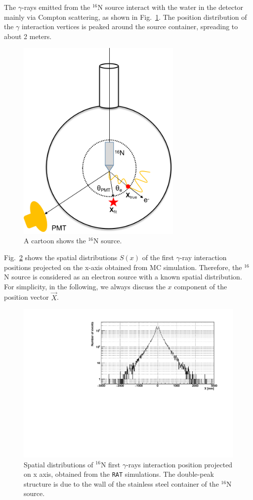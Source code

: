 The $\gamma$-rays emitted from the $^{16}$N source interact with the water in the detector mainly via Compton scattering, as shown in Fig.~\ref{N16centralDiagram}. The position distribution of the $\gamma$ interaction vertices is peaked around the source container, spreading to about 2 meters.

\begin{figure}[!htb]
	\centering
	\includegraphics[width=8cm]{N16centralDiagram.png}
	\caption{A cartoon shows the $^{16}$N source.}
	\label{N16centralDiagram}
\end{figure}

Fig.~\ref{hsx} shows the spatial distributions $S(x)$ of the first $\gamma$-ray interaction positions projected on the x-axis obtained from MC simulation. Therefore, the $^{16}$N source is considered as an electron source with a known spatial distribution\cite{boulay2004direct}. For simplicity, in the following, we always discuss the $x$ component of the position vector $\vec{X}$. 

\begin{figure}[!htb]
	\centering
	\includegraphics[width=12cm]{sx.pdf}
	\caption[Spatial distributions of {$^{16}$}N first $\gamma$-rays interaction position projected on x axis.]{Spatial distributions of {$^{16}$}N first $\gamma$-rays interaction position projected on x axis, obtained from the \texttt{RAT} simulations. The double-peak structure is due to the wall of the stainless steel container of the $^{16}$N source.}
	\label{hsx}
\end{figure}

